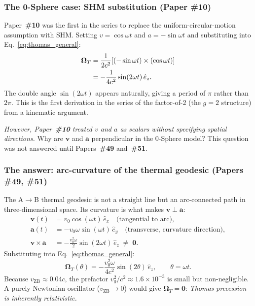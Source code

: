 \documentclass[12pt,letterpaper]{article}
\newcommand{\paperno}[1]{\textbf{\#{}#1}}
\newcommand{\vZB}{v_{\mathrm{ZB}}}
\begin{document}
\subsubsection{\texorpdfstring{The 0-Sphere case: SHM substitution (Paper \#10)}{The 0-Sphere case: SHM substitution (Paper \#10)}}

Paper~\paperno{10} \cite{hanamura10} was the first in the series to replace
the uniform-circular-motion assumption with SHM.
Setting $v = \cos\omega t$ and $a = -\sin\omega t$ and substituting into
Eq.~\eqref{eq:thomas_general}:
\begin{align}
\boldsymbol{\Omega}_T
&= \frac{1}{2c^2}[(-\sin\omega t)\times(\cos\omega t)] \notag\\
&= -\frac{1}{4c^2}\sin(2\omega t)\,\hat{e}_z.
\label{eq:omega_10}
\end{align}
The double angle $\sin(2\omega t)$ appears naturally, giving a period of $\pi$
rather than $2\pi$.
This is the first derivation in the series of the factor-of-2 (the $g=2$ structure)
from a kinematic argument.

\textit{However, Paper~\paperno{10} treated $v$ and $a$ as scalars without specifying
spatial directions.} Why are $\mathbf{v}$ and $\mathbf{a}$ perpendicular in the
0-Sphere model? This question was not answered until Papers~\paperno{49} and~\paperno{51}.

\subsubsection{\texorpdfstring{The answer: arc-curvature of the thermal geodesic (Papers \#49, \#51)}{The answer: arc-curvature of the thermal geodesic (Papers \#49, \#51)}}

The A$\to$B thermal geodesic is not a straight line but an arc-connected path in
three-dimensional space. Its curvature is what makes $\mathbf{v}\perp\mathbf{a}$:
\begin{align}
\mathbf{v}(t) &= v_0\cos(\omega t)\,\hat{e}_x \quad \text{(tangential to arc)},\\
\mathbf{a}(t) &= -v_0\omega\sin(\omega t)\,\hat{e}_y \quad \text{(transverse, curvature direction)},\\
\mathbf{v}\times\mathbf{a}
&= -\frac{v_0^2\omega}{2}\sin(2\omega t)\,\hat{e}_z \;\neq\; \mathbf{0}.
\label{eq:cross_product}
\end{align}
Substituting into Eq.~\eqref{eq:thomas_general}:
\begin{equation}
\boxed{\boldsymbol{\Omega}_T(\theta) = -\frac{v_0^2\omega}{4c^2}\sin(2\theta)\,\hat{e}_z, \qquad \theta = \omega t.}
\label{eq:omega_T}
\end{equation}
Because $\vZB\approx 0.04c$, the prefactor $v_0^2/c^2\approx 1.6\times10^{-3}$ is
small but non-negligible.
A purely Newtonian oscillator ($\vZB\to 0$) would give $\boldsymbol{\Omega}_T = \mathbf{0}$:
\emph{Thomas precession is inherently relativistic.}
\end{document}
